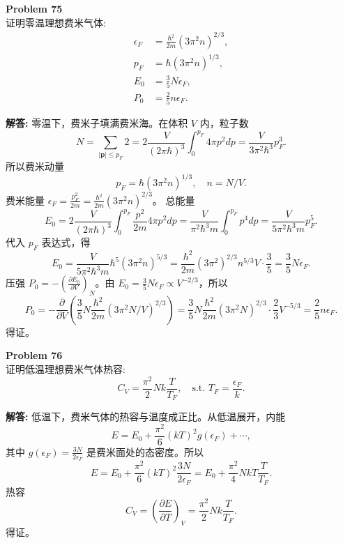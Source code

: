 \documentclass[12pt, a4paper, oneside]{ctexart}
\newenvironment{solution}{\par\noindent\textbf{解答:}\quad}{\par}
\begin{document}
\begin{mdframed}[backgroundcolor=gray!10, linewidth=0pt]
    \textbf{Problem 75} \\
    证明零温理想费米气体:
    \[
    \begin{aligned}
        \epsilon_F &= \frac{\hbar^2}{2m} (3\pi^2 n)^{2/3}, \\
        p_F &= \hbar (3\pi^2 n)^{1/3}, \\
        E_0 &= \frac{3}{5} N \epsilon_F, \\
        P_0 &= \frac{2}{5} n \epsilon_F.
    \end{aligned}
    \]
\end{mdframed}
\begin{solution}
    零温下，费米子填满费米海。在体积 $V$ 内，粒子数
    \[
    N = \sum_{|\mathbf{p}| \le p_F} 2 = 2 \frac{V}{(2\pi\hbar)^3} \int_0^{p_F} 4\pi p^2 dp = \frac{V}{3\pi^2 \hbar^3} p_F^3.
    \]
    所以费米动量
    \[
    p_F = \hbar (3\pi^2 n)^{1/3}, \quad n = N/V.
    \]
    费米能量 $\epsilon_F = \frac{p_F^2}{2m} = \frac{\hbar^2}{2m} (3\pi^2 n)^{2/3}$。
    总能量
    \[
    E_0 = 2 \frac{V}{(2\pi\hbar)^3} \int_0^{p_F} \frac{p^2}{2m} 4\pi p^2 dp = \frac{V}{\pi^2 \hbar^3 m} \int_0^{p_F} p^4 dp = \frac{V}{5\pi^2 \hbar^3 m} p_F^5.
    \]
    代入 $p_F$ 表达式，得
    \[
    E_0 = \frac{V}{5\pi^2 \hbar^3 m} \hbar^5 (3\pi^2 n)^{5/3} = \frac{\hbar^2}{2m} (3\pi^2)^{2/3} n^{5/3} V \cdot \frac{3}{5} = \frac{3}{5} N \epsilon_F.
    \]
    压强 $P_0 = -\left( \frac{\partial E_0}{\partial V} \right)_N$。由 $E_0 = \frac{3}{5} N \epsilon_F \propto V^{-2/3}$，所以
    \[
    P_0 = -\frac{\partial}{\partial V} \left( \frac{3}{5} N \frac{\hbar^2}{2m} (3\pi^2 N / V)^{2/3} \right) = \frac{3}{5} N \frac{\hbar^2}{2m} (3\pi^2 N)^{2/3} \cdot \frac{2}{3} V^{-5/3} = \frac{2}{5} n \epsilon_F.
    \]
    得证。
\end{solution}

\begin{mdframed}[backgroundcolor=gray!10, linewidth=0pt]
    \textbf{Problem 76} \\
    证明低温理想费米气体热容:
    \[
    C_V = \frac{\pi^2}{2} N k \frac{T}{T_F}, \quad \text{s.t. } T_F = \frac{\epsilon_F}{k}.
    \]
\end{mdframed}
\begin{solution}
    低温下，费米气体的热容与温度成正比。从低温展开，内能
    \[
    E = E_0 + \frac{\pi^2}{6} (kT)^2 g(\epsilon_F) + \cdots,
    \]
    其中 $g(\epsilon_F) = \frac{3N}{2\epsilon_F}$ 是费米面处的态密度。所以
    \[
    E = E_0 + \frac{\pi^2}{6} (kT)^2 \frac{3N}{2\epsilon_F} = E_0 + \frac{\pi^2}{4} N k T \frac{T}{T_F}.
    \]
    热容
    \[
    C_V = \left( \frac{\partial E}{\partial T} \right)_V = \frac{\pi^2}{2} N k \frac{T}{T_F}.
    \]
    得证。
\end{solution}
\end{document}
